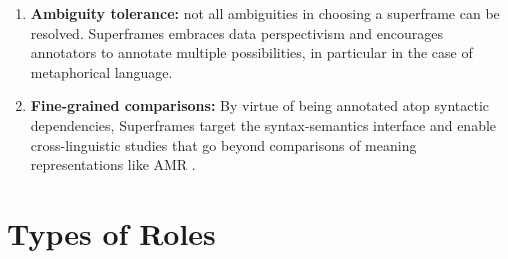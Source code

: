 \documentclass[a4paper]{article}
\begin{document}
\begin{enumerate}
    \item \textbf{Ambiguity tolerance:} not all ambiguities in choosing a superframe can be resolved. Superframes embraces data perspectivism \citep{basile-2020-end} and encourages annotators to annotate multiple possibilities, in particular in the case of metaphorical language.
    \item \textbf{Fine-grained comparisons:} By virtue of being annotated atop syntactic dependencies, Superframes target the syntax-semantics interface and enable cross-linguistic studies that go beyond comparisons of meaning representations like AMR \citep{banarescu-etal-2013-abstract}.
\end{enumerate}


\clearpage
\section{Types of Roles}
\end{document}
